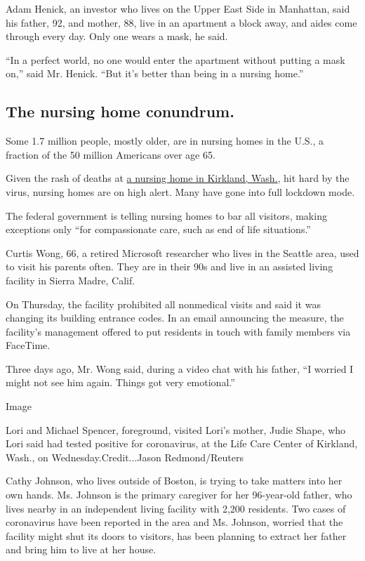 Adam Henick, an investor who lives on the Upper East Side in Manhattan,
said his father, 92, and mother, 88, live in an apartment a block away,
and aides come through every day. Only one wears a mask, he said.

``In a perfect world, no one would enter the apartment without putting a
mask on,'' said Mr. Henick. ``But it's better than being in a nursing
home.''

\hypertarget{the-nursing-home-conundrum}{%
\subsection{The nursing home
conundrum.}\label{the-nursing-home-conundrum}}

Some 1.7 million people, mostly older, are in nursing homes in the U.S.,
a fraction of the 50 million Americans over age 65.

Given the rash of deaths at
\href{https://www.nytimes3xbfgragh.onion/2020/03/07/us/coronavirus-nursing-home.html}{a
nursing home in Kirkland, Wash.}, hit hard by the virus, nursing homes
are on high alert. Many have gone into full lockdown mode.

The federal government is telling nursing homes to bar all visitors,
making exceptions only ``for compassionate care, such as end of life
situations.''

Curtis Wong, 66, a retired Microsoft researcher who lives in the Seattle
area, used to visit his parents often. They are in their 90s and live in
an assisted living facility in Sierra Madre, Calif.

On Thursday, the facility prohibited all nonmedical visits and said it
was changing its building entrance codes. In an email announcing the
measure, the facility's management offered to put residents in touch
with family members via FaceTime.

Three days ago, Mr. Wong said, during a video chat with his father, ``I
worried I might not see him again. Things got very emotional.''

Image

Lori and Michael Spencer, foreground, visited Lori's mother, Judie
Shape, who Lori said had tested positive for coronavirus, at the Life
Care Center of Kirkland, Wash., on Wednesday.Credit...Jason
Redmond/Reuters

Cathy Johnson, who lives outside of Boston, is trying to take matters
into her own hands. Ms. Johnson is the primary caregiver for her
96-year-old father, who lives nearby in an independent living facility
with 2,200 residents. Two cases of coronavirus have been reported in the
area and Ms. Johnson, worried that the facility might shut its doors to
visitors, has been planning to extract her father and bring him to live
at her house.

